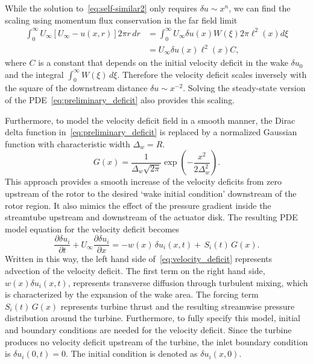 While the solution to~\eqref{eq:self-similar2} only requires $\delta u \sim x^n$, we can find the scaling using momentum flux conservation in the far field limit
\begin{equation}
\begin{split}
\int_0^\infty U_\infty \left[ U_\infty - u(x,r) \right] 2 \pi r \, dr &= \int_0^\infty U_\infty \delta u(x) W\left( \xi \right) 2 \pi \ell^2(x) d\xi \\
&= U_\infty \delta u(x) \ell^2(x) C,
\end{split}
\end{equation}
where $C$ is a constant that depends on the initial velocity deficit in the wake $\delta u_0$ and the integral $\int_0^\infty W(\xi) \, d\xi$. Therefore the velocity deficit scales inversely with the square of the downstream distance $\delta u \sim x^{-2}$. Solving the steady-state version of the PDE~\eqref{eq:preliminary_deficit} also provides this scaling.

Furthermore, to model the velocity deficit field in a smooth manner, the Dirac delta function in~\eqref{eq:preliminary_deficit} is replaced by a normalized Gaussian function with characteristic width $\Delta_w=R$.
\begin{equation}
\label{eq:gaussian}
G(x) = \frac{1}{\Delta_w\sqrt{2\pi}} \exp \left({-\frac{x^2}{2 \Delta_w^2}} \right).
\end{equation}
This approach provides a smooth increase of the velocity deficits from zero upstream of the rotor to the desired `wake initial condition' downstream of the rotor region. It also mimics the effect of the pressure gradient inside the streamtube upstream and downstream of the actuator disk. The resulting PDE model equation for the velocity deficit becomes 
\begin{equation}
\label{eq:velocity_deficit}
\frac{\partial \delta u_i}{\partial t} + U_\infty \frac{\partial \delta u_i }{\partial x} = - w(x) \,\delta u_i(x,t) + \,S_i(t) \, G(x).
\end{equation}
Written in this way, the left hand side of~\eqref{eq:velocity_deficit} represents advection of the velocity deficit. The first term on the right hand side, $w(x)\delta u_i(x,t)$, represents transverse diffusion through turbulent mixing, which is characterized by the expansion of the wake area. The forcing term $S_i(t) \, G(x)$ represents turbine thrust and the resulting streamwise pressure distribution around the turbine. Furthermore, to fully specify this model, initial and boundary conditions are needed for the velocity deficit. Since the turbine produces no velocity deficit upstream of the turbine, the inlet boundary condition is $\delta u_i(0, t) = 0$. The initial condition is denoted as $\delta u_i(x,0)$. 

